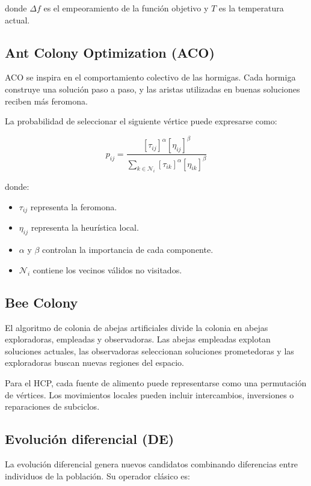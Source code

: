 \documentclass[12pt]{article}
\begin{document}
donde \(\Delta f\) es el empeoramiento de la función objetivo y \(T\) es la temperatura actual. \cite{kirkpatrick}

\subsection{Ant Colony Optimization (ACO)}

ACO se inspira en el comportamiento colectivo de las hormigas. Cada hormiga construye una solución paso a paso, y las aristas utilizadas en buenas soluciones reciben más feromona.

La probabilidad de seleccionar el siguiente vértice puede expresarse como:

\[
p_{ij}=
\frac{[\tau_{ij}]^\alpha[\eta_{ij}]^\beta}
{\sum_{k\in \mathcal{N}_i}[\tau_{ik}]^\alpha[\eta_{ik}]^\beta}
\]

donde:

\begin{itemize}
    \item \(\tau_{ij}\) representa la feromona.
    \item \(\eta_{ij}\) representa la heurística local.
    \item \(\alpha\) y \(\beta\) controlan la importancia de cada componente.
    \item \(\mathcal{N}_i\) contiene los vecinos válidos no visitados.
\end{itemize}

\subsection{Bee Colony}

El algoritmo de colonia de abejas artificiales divide la colonia en abejas exploradoras, empleadas y observadoras. Las abejas empleadas explotan soluciones actuales, las observadoras seleccionan soluciones prometedoras y las exploradoras buscan nuevas regiones del espacio.

Para el HCP, cada fuente de alimento puede representarse como una permutación de vértices. Los movimientos locales pueden incluir intercambios, inversiones o reparaciones de subciclos. \cite{karaboga}

\subsection{Evolución diferencial (DE)}

La evolución diferencial genera nuevos candidatos combinando diferencias entre individuos de la población. Su operador clásico es:
\end{document}
